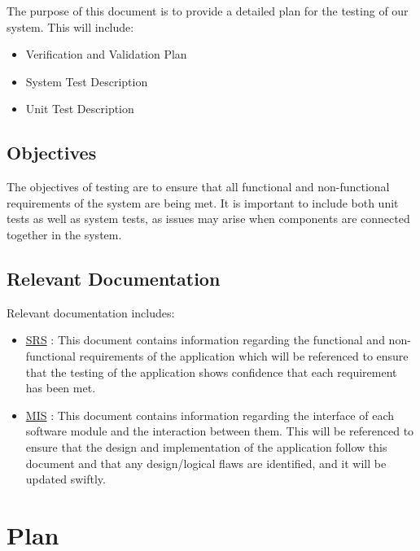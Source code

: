 \documentclass[12pt, titlepage]{article}
\begin{document}
The purpose of this document is to provide a detailed plan for the testing of our system. This will include:
\begin{itemize}
  \item Verification and Validation Plan
  \item System Test Description
  \item Unit Test Description
\end{itemize}

\subsection{Objectives}

The objectives of testing are to ensure that all functional and non-functional requirements of the system are being met. It is important to include both unit tests as well as system tests, as issues may arise when components are connected together in the system. 

\subsection{Relevant Documentation}

Relevant documentation includes:
\begin{itemize}
  \item \href{../SRS/SRS.pdf}{SRS} : This document contains information regarding the functional and non-functional requirements of the application which will be referenced to ensure that the testing of the application shows confidence that each requirement has been met.
  \item \href{../Design/SoftDetailedDes/MIS.pdf}{MIS} : This document contains information regarding the interface of each software module and the interaction between them. This will be referenced to ensure that the design and implementation of the application follow this document and that any design/logical flaws are identified, and it will be updated swiftly.
\end{itemize}

\section{Plan}
\end{document}
